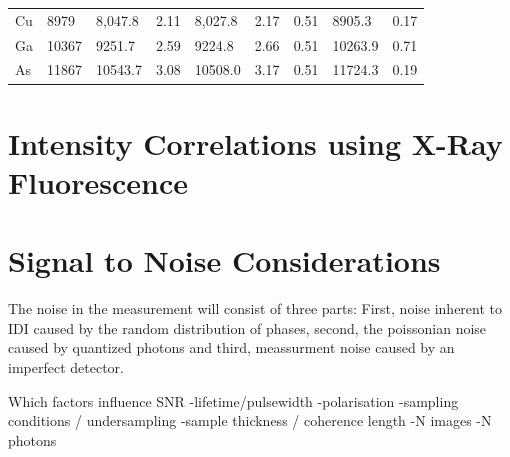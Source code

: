 \begin{table}[]
\begin{tabular}{l|l|ll|lll|ll}
		Cu      & 8979                                                   & 8,047.8                                                & 2.11                                                 & 8,027.8                                                & 2.17                                                 & 0.51                                                      & 8905.3                                                & 0.17                                                      \\
		Ga      & 10367                                                  & 9251.7                                                 & 2.59                                                 & 9224.8                                                 & 2.66                                                 & 0.51                                                      & 10263.9                                               & 0.71                                                      \\
		As      & 11867                                                  & 10543.7                                                & 3.08                                                 & 10508.0                                                & 3.17                                                 & 0.51                                                      & 11724.3                                               & 0.19                                                      \\ \hline
	\end{tabular}
\end{table}
\section{Intensity Correlations using X-Ray Fluorescence}
\section{Signal to Noise Considerations}


The noise in the measurement will consist of three parts: First, noise inherent to IDI caused by the random distribution of phases, second, the poissonian noise caused by quantized photons and third, meassurment noise caused by an imperfect detector.

Which factors influence SNR
-lifetime/pulsewidth
-polarisation
-sampling conditions / undersampling
-sample thickness / coherence length
-N images
-N photons



